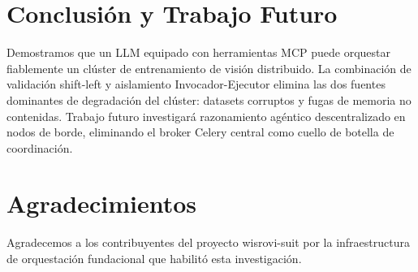 \documentclass[10pt,twocolumn,letterpaper]{article}
\begin{document}
\section{Conclusión y Trabajo Futuro}
Demostramos que un LLM equipado con herramientas MCP puede orquestar fiablemente un clúster de entrenamiento de visión distribuido. La combinación de validación shift-left y aislamiento Invocador-Ejecutor elimina las dos fuentes dominantes de degradación del clúster: datasets corruptos y fugas de memoria no contenidas. Trabajo futuro investigará razonamiento agéntico descentralizado en nodos de borde, eliminando el broker Celery central como cuello de botella de coordinación.

\section{Agradecimientos}
Agradecemos a los contribuyentes del proyecto wisrovi-suit por la infraestructura de orquestación fundacional que habilitó esta investigación.



\end{document}
